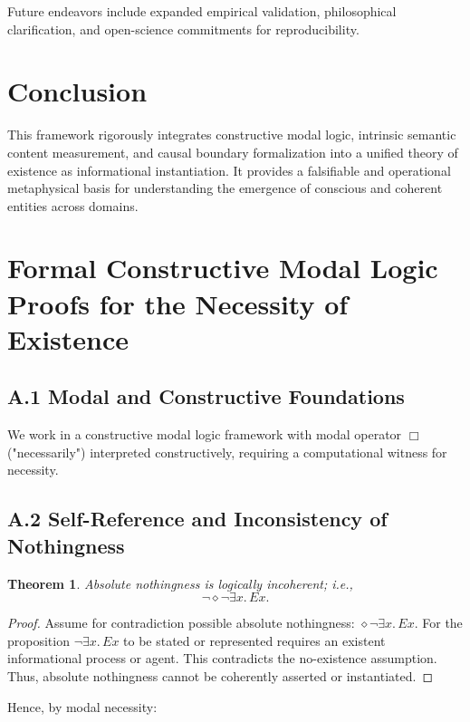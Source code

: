 \documentclass[12pt,a4paper]{article}
\newtheorem{theorem}{Theorem}[section]
\begin{document}
Future endeavors include expanded empirical validation, philosophical clarification, and open-science commitments for reproducibility.

\section{Conclusion}

This framework rigorously integrates constructive modal logic, intrinsic semantic content measurement, and causal boundary formalization into a unified theory of existence as informational instantiation. It provides a falsifiable and operational metaphysical basis for understanding the emergence of conscious and coherent entities across domains.

\newpage
\appendix

\section{Formal Constructive Modal Logic Proofs for the Necessity of Existence}

\subsection{A.1 Modal and Constructive Foundations}

We work in a constructive modal logic framework with modal operator $\Box$ ("necessarily") interpreted constructively, requiring a computational witness for necessity.

\subsection{A.2 Self-Reference and Inconsistency of Nothingness}

\begin{theorem}
Absolute nothingness is logically incoherent; i.e.,
\[
\neg \diamond \neg \exists x.\, Ex.
\]
\end{theorem}

\begin{proof}
Assume for contradiction possible absolute nothingness: $\diamond \neg \exists x.\, Ex$. For the proposition $\neg \exists x.\, Ex$ to be stated or represented requires an existent informational process or agent. This contradicts the no-existence assumption. Thus, absolute nothingness cannot be coherently asserted or instantiated.
\end{proof}

Hence, by modal necessity:
\end{document}
